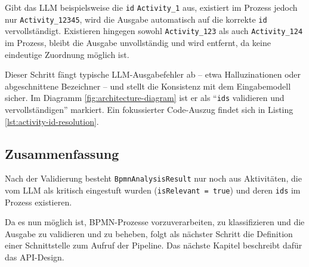 Gibt das \ac{LLM} beispielsweise die \texttt{id} \texttt{Activity\_1} aus, existiert im Prozess jedoch nur \texttt{Activity\_12345}, wird die Ausgabe automatisch auf die korrekte \texttt{id} vervollständigt. Existieren hingegen sowohl \texttt{Activity\_123} als auch \texttt{Activity\_124} im Prozess, bleibt die Ausgabe unvollständig und wird entfernt, da keine eindeutige Zuordnung möglich ist.

Dieser Schritt fängt typische \ac{LLM}-Ausgabefehler ab – etwa Halluzinationen oder abgeschnittene Bezeichner – und stellt die Konsistenz mit dem Eingabemodell sicher. Im Diagramm \ref{fig:architecture-diagram} ist er als \enquote{\texttt{ids} validieren und vervollständigen} markiert. Ein fokussierter Code-Auszug findet sich in Listing \ref{lst:activity-id-resolution}.

\subsection*{Zusammenfassung}

Nach der Validierung besteht \texttt{BpmnAnalysisResult} nur noch aus Aktivitäten, die vom \ac{LLM} als kritisch eingestuft wurden (\texttt{isRelevant = true}) und deren \texttt{ids} im Prozess existieren.

Da es nun möglich ist, \ac{BPMN}-Prozesse vorzuverarbeiten, zu klassifizieren und die Ausgabe zu validieren und zu beheben, folgt als nächster Schritt die Definition einer Schnittstelle zum Aufruf der Pipeline. Das nächste Kapitel beschreibt dafür das API-Design.